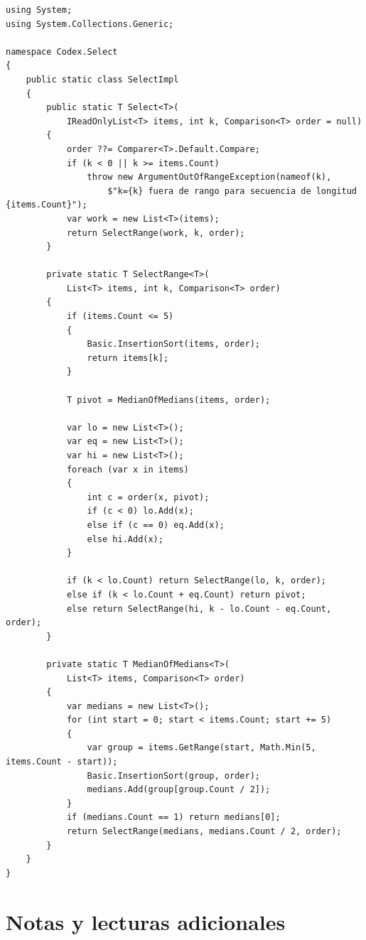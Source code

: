 \documentclass[11pt,a4paper]{article}
\begin{document}
\begin{lstlisting}[caption={\texttt{Select.cs} --- mediana de medianas (BFPRT)}]
using System;
using System.Collections.Generic;

namespace Codex.Select
{
    public static class SelectImpl
    {
        public static T Select<T>(
            IReadOnlyList<T> items, int k, Comparison<T> order = null)
        {
            order ??= Comparer<T>.Default.Compare;
            if (k < 0 || k >= items.Count)
                throw new ArgumentOutOfRangeException(nameof(k),
                    $"k={k} fuera de rango para secuencia de longitud {items.Count}");
            var work = new List<T>(items);
            return SelectRange(work, k, order);
        }

        private static T SelectRange<T>(
            List<T> items, int k, Comparison<T> order)
        {
            if (items.Count <= 5)
            {
                Basic.InsertionSort(items, order);
                return items[k];
            }

            T pivot = MedianOfMedians(items, order);

            var lo = new List<T>();
            var eq = new List<T>();
            var hi = new List<T>();
            foreach (var x in items)
            {
                int c = order(x, pivot);
                if (c < 0) lo.Add(x);
                else if (c == 0) eq.Add(x);
                else hi.Add(x);
            }

            if (k < lo.Count) return SelectRange(lo, k, order);
            else if (k < lo.Count + eq.Count) return pivot;
            else return SelectRange(hi, k - lo.Count - eq.Count, order);
        }

        private static T MedianOfMedians<T>(
            List<T> items, Comparison<T> order)
        {
            var medians = new List<T>();
            for (int start = 0; start < items.Count; start += 5)
            {
                var group = items.GetRange(start, Math.Min(5, items.Count - start));
                Basic.InsertionSort(group, order);
                medians.Add(group[group.Count / 2]);
            }
            if (medians.Count == 1) return medians[0];
            return SelectRange(medians, medians.Count / 2, order);
        }
    }
}
\end{lstlisting}

\section{Notas y lecturas adicionales}
\end{document}
